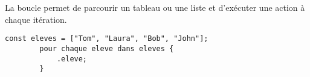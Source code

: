 \documentclass[../userguide.tex]{subfiles}
\begin{document}
    La boucle  permet de parcourir un tableau ou une liste et d'exécuter une action à chaque
    itération.

    \begin{lstlisting}[label=lst:boucle-pour-chaque-1]
        const eleves = ["Tom", "Laura", "Bob", "John"];
        pour chaque eleve dans eleves {
            .eleve;
        }
    \end{lstlisting}
\end{document}
